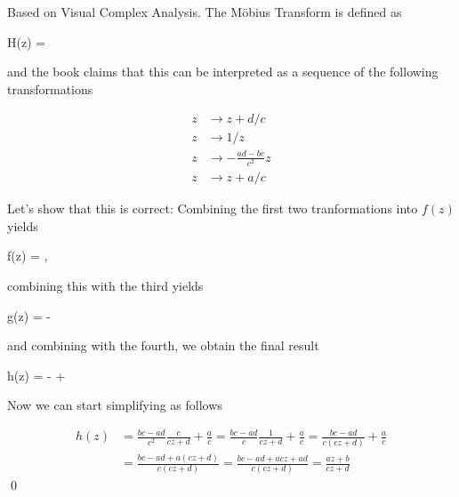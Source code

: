 
Based on Visual Complex Analysis. The Möbius Transform is defined as

\bee
H(z) = 
\eee

and the book claims that this can be interpreted as a sequence of the following transformations

\begin{align*}
z & \rightarrow z + d/c \\
z & \rightarrow 1/z \\
z & \rightarrow - \frac{ad-bc}{c^2} z \\
z & \rightarrow z + a/c
\end{align*}

Let's show that this is correct: Combining the first two tranformations into $f(z)$ yields

\bee
f(z) = ,
\eee

combining this with the third yields

\bee
g(z) = -  
\eee

and combining with the fourth, we obtain the final result

\bee
h(z) = -   + 
\eee

Now we can start simplifying as follows

\begin{align*}
h(z) & = \frac{bc-ad}{c^2} \frac{c}{cz + d} + \frac{a}{c} = \frac{bc-ad}{c} \frac{1}{cz + d} + \frac{a}{c} = \frac{bc-ad}{c(cz+d)} + \frac{a}{c} 
\\ & = \frac{bc-ad+a(cz+d)}{c(cz+d)} = \frac{bc-ad+acz+ad}{c(cz+d)} = \frac{az+b}{cz+d}
\end{align*}
\qed
